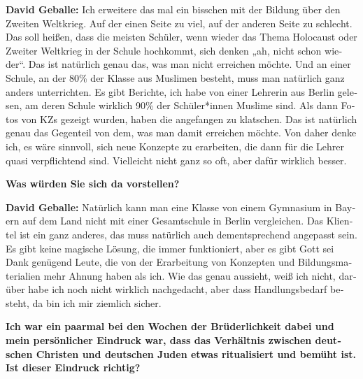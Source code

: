 \begin{otherlanguage}{ngerman}
\textbf{David Geballe:} Ich erweitere das mal ein bisschen mit der Bildung über den Zweiten Weltkrieg. Auf der einen Seite zu viel, auf der anderen Seite zu schlecht. Das soll heißen, dass die meisten Schüler, wenn wieder das Thema Holocaust oder Zweiter Weltkrieg in der Schule hochkommt, sich denken „ah, nicht schon wieder“. Das ist natürlich genau das, was man nicht erreichen möchte. Und an einer Schule, an der 80\% der Klasse aus Muslimen besteht, muss man natürlich ganz anders unterrichten. Es gibt Berichte, ich habe von einer Lehrerin aus Berlin gelesen, am deren Schule wirklich 90\% der Schüler*innen Muslime sind. Als dann Fotos von KZs gezeigt wurden, haben die angefangen zu klatschen. Das ist natürlich genau das Gegenteil von dem, was man damit erreichen möchte. Von daher denke ich, es wäre sinnvoll, sich neue Konzepte zu erarbeiten, die dann für die Lehrer quasi verpflichtend sind. Vielleicht nicht ganz so oft, aber dafür wirklich besser. 

\textbf{Was würden Sie sich da vorstellen?} 

\textbf{David Geballe:} Natürlich kann man eine Klasse von einem Gymnasium in Bayern auf dem Land nicht mit einer Gesamtschule in Berlin vergleichen. Das Klientel ist ein ganz anderes, das muss natürlich auch dementsprechend angepasst sein. Es gibt keine magische Lösung, die immer funktioniert, aber es gibt Gott sei Dank genügend Leute, die von der Erarbeitung von Konzepten und Bildungsmaterialien mehr Ahnung haben als ich. Wie das genau aussieht, weiß ich nicht, darüber habe ich noch nicht wirklich nachgedacht, aber dass Handlungsbedarf besteht, da bin ich mir ziemlich sicher. 

\textbf{Ich war ein paarmal bei den Wochen der Brüderlichkeit dabei und mein persönlicher Eindruck war, dass das Verhältnis zwischen deutschen Christen und deutschen Juden etwas ritualisiert und bemüht ist. Ist dieser Eindruck richtig?} 


\end{otherlanguage}
